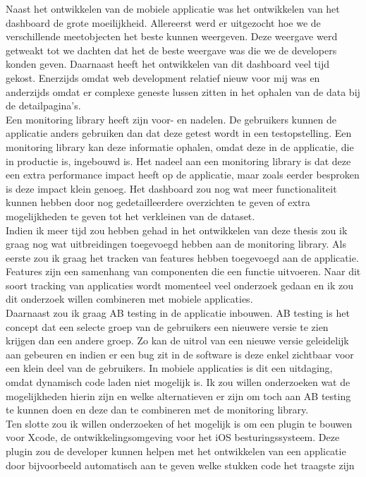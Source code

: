 Naast het ontwikkelen van de mobiele applicatie was het ontwikkelen van het dashboard de grote moeilijkheid. Allereerst werd er uitgezocht hoe we de verschillende meetobjecten het beste kunnen weergeven. Deze weergave werd getweakt tot we dachten dat het de beste weergave was die we de developers konden geven. Daarnaast heeft het ontwikkelen van dit dashboard veel tijd gekost. Enerzijds omdat web development relatief nieuw voor mij was en anderzijds omdat er complexe geneste lussen zitten in het ophalen van de data bij de detailpagina's. \\

Een monitoring library heeft zijn voor- en nadelen. De gebruikers kunnen de applicatie anders gebruiken dan dat deze getest wordt in een testopstelling. Een monitoring library kan deze informatie ophalen, omdat deze in de applicatie, die in productie is, ingebouwd is. Het nadeel aan een monitoring library is dat deze een extra performance impact heeft op de applicatie, maar zoals eerder besproken is deze impact klein genoeg. Het dashboard zou nog wat meer functionaliteit kunnen hebben door nog gedetailleerdere overzichten te geven of extra mogelijkheden te geven tot het verkleinen van de dataset. \\

Indien ik meer tijd zou hebben gehad in het ontwikkelen van deze thesis zou ik graag nog wat uitbreidingen toegevoegd hebben aan de monitoring library. Als eerste zou ik graag het tracken van features hebben toegevoegd aan de applicatie. Features zijn een samenhang van componenten die een functie uitvoeren. Naar dit soort tracking van applicaties wordt momenteel veel onderzoek gedaan en ik zou dit onderzoek willen combineren met mobiele applicaties. \\
Daarnaast zou ik graag AB testing in de applicatie inbouwen. AB testing is het concept dat een selecte groep van de gebruikers een nieuwere versie te zien krijgen dan een andere groep. Zo kan de uitrol van een nieuwe versie geleidelijk aan gebeuren en indien er een bug zit in de software is deze enkel zichtbaar voor een klein deel van de gebruikers. In mobiele applicaties is dit een uitdaging, omdat dynamisch code laden niet mogelijk is. Ik zou willen onderzoeken wat de mogelijkheden hierin zijn en welke alternatieven er zijn om toch aan AB testing te kunnen doen en deze dan te combineren met de monitoring library.\\
Ten slotte zou ik willen onderzoeken of het mogelijk is om een plugin te bouwen voor Xcode, de ontwikkelingsomgeving voor het iOS besturingssysteem. Deze plugin zou de developer kunnen helpen met het ontwikkelen van een applicatie door bijvoorbeeld automatisch aan te geven welke stukken code het traagste zijn%
 
